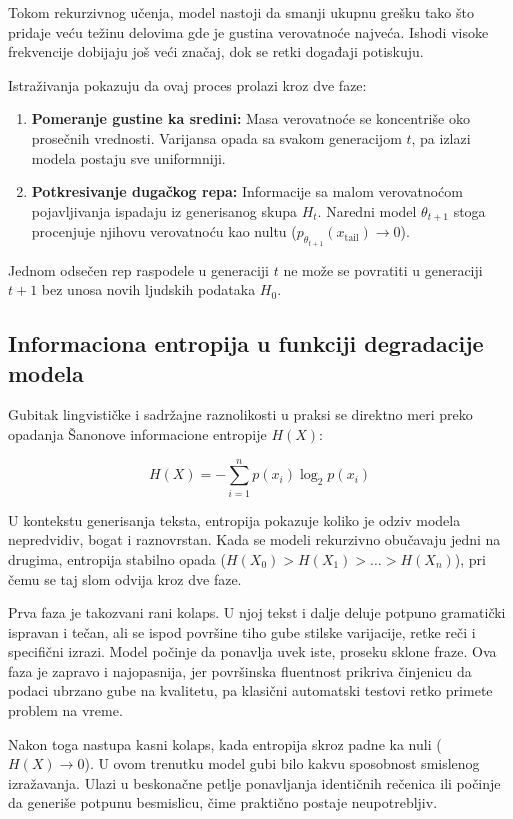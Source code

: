 \documentclass[12pt]{article}
\begin{document}
	Tokom rekurzivnog učenja, model nastoji da smanji ukupnu grešku tako što pridaje veću težinu delovima gde je gustina verovatnoće najveća. Ishodi visoke frekvencije dobijaju još veći značaj, dok se retki događaji potiskuju.
	
	Istraživanja pokazuju da ovaj proces prolazi kroz dve faze:
	\begin{enumerate}
		\item \textbf{Pomeranje gustine ka sredini:} Masa verovatnoće se koncentriše oko prosečnih vrednosti. Varijansa opada sa svakom generacijom $t$, pa izlazi modela postaju sve uniformniji.
		\item \textbf{Potkresivanje dugačkog repa:} Informacije sa malom verovatnoćom pojavljivanja ispadaju iz generisanog skupa $H_t$. Naredni model $\theta_{t+1}$ stoga procenjuje njihovu verovatnoću kao nultu ($p_{\theta_{t+1}}(x_{\text{tail}}) \to 0$).
	\end{enumerate}
	
	Jednom odsečen rep raspodele u generaciji $t$ ne može se povratiti u generaciji $t+1$ bez unosa novih ljudskih podataka $H_0$.
	
	\subsection{Informaciona entropija u funkciji degradacije modela}
	Gubitak lingvističke i sadržajne raznolikosti u praksi se direktno meri preko opadanja Šanonove informacione entropije $H(X)$:
	
	$$H(X) = -\sum_{i=1}^{n} p(x_i) \log_2 p(x_i)$$
	
	U kontekstu generisanja teksta, entropija pokazuje koliko je odziv modela nepredvidiv, bogat i raznovrstan. Kada se modeli rekurzivno obučavaju jedni na drugima, entropija stabilno opada ($H(X_0) > H(X_1) > \dots > H(X_n)$), pri čemu se taj slom odvija kroz dve faze.
	
	Prva faza je takozvani rani kolaps. U njoj tekst i dalje deluje potpuno gramatički ispravan i tečan, ali se ispod površine tiho gube stilske varijacije, retke reči i specifični izrazi. Model počinje da ponavlja uvek iste, proseku sklone fraze. Ova faza je zapravo i najopasnija, jer površinska fluentnost prikriva činjenicu da podaci ubrzano gube na kvalitetu, pa klasični automatski testovi retko primete problem na vreme.
	
	Nakon toga nastupa kasni kolaps, kada entropija skroz padne ka nuli ($H(X) \to 0$). U ovom trenutku model gubi bilo kakvu sposobnost smislenog izražavanja. Ulazi u beskonačne petlje ponavljanja identičnih rečenica ili počinje da generiše potpunu besmislicu, čime praktično postaje neupotrebljiv.
	
\end{document}

